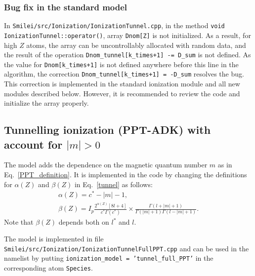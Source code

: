 \documentclass[prd, preprint,
aps,
amsmath,
amssymb,
onecolumn,
nofootinbib,
superscriptaddress,
]{revtex4-2}
\begin{document}
	\subsubsection{Bug fix in the standard model}
	In \texttt{Smilei/src/Ionization/IonizationTunnel.cpp}, in the method \texttt{void IonizationTunnel::operator()}, array \texttt{Dnom[Z]} is not initialized. As a result, for high $Z$ atoms, the array can be uncontrollably allocated with random data, and the result of the operation \texttt{Dnom\_tunnel[k\_times+1] -= D\_sum} is not defined. As the value for \texttt{Dnom[k\_times+1]} is not defined anywhere before this line in the algorithm, the correction \texttt{Dnom\_tunnel[k\_times+1] = -D\_sum} resolves the bug. This correction is implemented in the standard ionization module and all new modules described below. However, it is recommended to review the code and initialize the array properly.
	
	\subsection{Tunnelling ionization (PPT-ADK) with account for $|m|>0$}
	The model adds the dependence on the magnetic quantum number $m$ as in Eq.~\eqref{PPT_definition}. It is implemented in the code by changing the definitions for $\alpha(Z)$ and $\beta(Z)$ in Eq.~\eqref{tunnel} as follows:
	\begin{gather}
		\alpha(Z) = c^*-|m|-1,\\
		\beta(Z) = I_p\frac{2^{\alpha(Z)} \left[ 8l+4 \right]}{c^*\Gamma(c^*)} \times \frac{\Gamma(l+|m|+1)}{\Gamma(|m|+1)\Gamma(l-|m|+1)}.
	\end{gather}
	Note that $\beta(Z)$ depends both on $l^*$ and $l$. 
	
	The model is implemented in file \texttt{Smilei/src/Ionization/IonizationTunnelFullPPT.cpp} and can be used in the namelist by putting \texttt{ionization\_model = 'tunnel\_full\_PPT'} in the corresponding atom \texttt{Species}.
	
\end{document}

